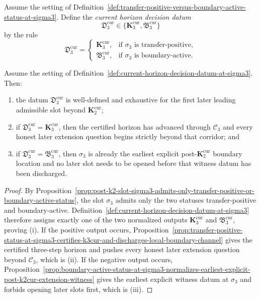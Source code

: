 \begin{definition}
\label{def:current-horizon-decision-datum-at-sigma3}
Assume the setting of Definition~\ref{def:transfer-positive-versus-boundary-active-status-at-sigma3}. Define the \emph{current horizon decision datum}
\[
  \mathfrak D_3^{\mathrm{cur}}\in\{\mathbf K_3^{\mathrm{cur}},\mathfrak B_3^{\mathrm{cur}}\}
\]
by the rule
\[
  \mathfrak D_3^{\mathrm{cur}}=
  \begin{cases}
    \mathbf K_3^{\mathrm{cur}}, & \text{if }\sigma_3\text{ is transfer-positive},\\[2mm]
    \mathfrak B_3^{\mathrm{cur}}, & \text{if }\sigma_3\text{ is boundary-active}.
  \end{cases}
\]
\end{definition}

\begin{proposition}
\label{prop:first-slot-beyond-k2cur-admits-finite-decision-normal-form}
Assume the setting of Definition~\ref{def:current-horizon-decision-datum-at-sigma3}. Then:
\begin{enumerate}[label=(\roman*)]
  \item the datum $\mathfrak D_3^{\mathrm{cur}}$ is well-defined and exhaustive for the first later leading admissible slot beyond $\mathbf K_2^{\mathrm{cur}}$;
  \item if $\mathfrak D_3^{\mathrm{cur}}=\mathbf K_3^{\mathrm{cur}}$, then the certified horizon has advanced through $\mathcal C_3$ and every honest later extension question begins strictly beyond that corridor; and
  \item if $\mathfrak D_3^{\mathrm{cur}}=\mathfrak B_3^{\mathrm{cur}}$, then $\sigma_3$ is already the earliest explicit post-$\mathbf K_2^{\mathrm{cur}}$ boundary location and no later slot needs to be opened before that witness datum has been discharged.
\end{enumerate}
\end{proposition}

\begin{proof}
By Proposition~\ref{prop:post-k2-slot-sigma3-admits-only-transfer-positive-or-boundary-active-status}, the slot $\sigma_3$ admits only the two statuses transfer-positive and boundary-active. Definition~\ref{def:current-horizon-decision-datum-at-sigma3} therefore assigns exactly one of the two normalized outputs $\mathbf K_3^{\mathrm{cur}}$ and $\mathfrak B_3^{\mathrm{cur}}$, proving (i). If the positive output occurs, Proposition~\ref{prop:transfer-positive-status-at-sigma3-certifies-k3cur-and-discharges-local-boundary-channel} gives the certified three-step horizon and pushes every honest later extension question beyond $\mathcal C_3$, which is (ii). If the negative output occurs, Proposition~\ref{prop:boundary-active-status-at-sigma3-normalizes-earliest-explicit-post-k2cur-extension-witness} gives the earliest explicit witness datum at $\sigma_3$ and forbids opening later slots first, which is (iii).
\end{proof}

